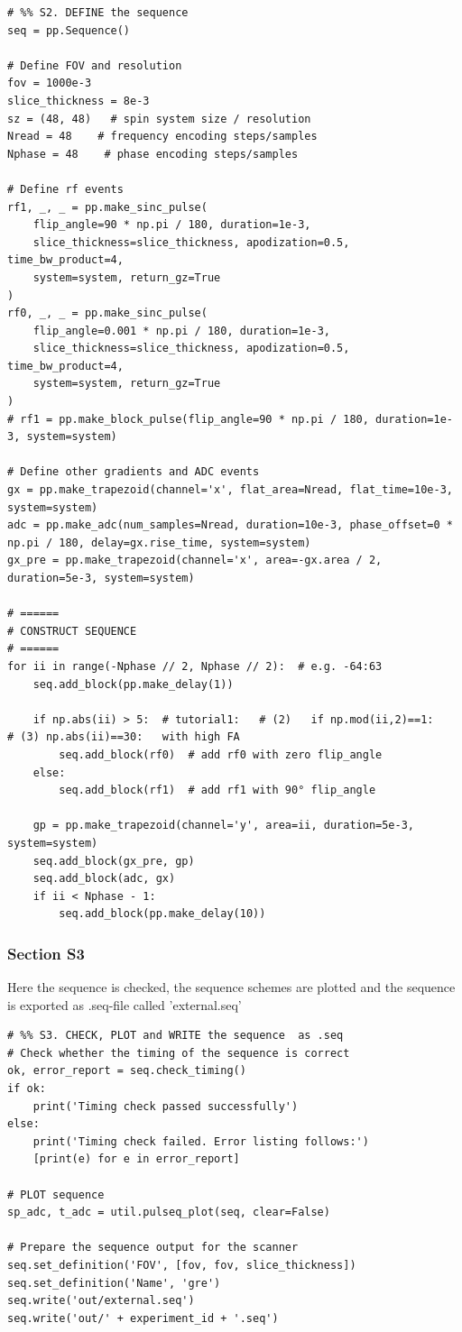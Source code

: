 \documentclass[a4paper,12pt]{extarticle}
\begin{document}
\begin{verbatim}
# %% S2. DEFINE the sequence
seq = pp.Sequence()

# Define FOV and resolution
fov = 1000e-3
slice_thickness = 8e-3
sz = (48, 48)   # spin system size / resolution
Nread = 48    # frequency encoding steps/samples
Nphase = 48    # phase encoding steps/samples

# Define rf events
rf1, _, _ = pp.make_sinc_pulse(
    flip_angle=90 * np.pi / 180, duration=1e-3,
    slice_thickness=slice_thickness, apodization=0.5, time_bw_product=4,
    system=system, return_gz=True
)
rf0, _, _ = pp.make_sinc_pulse(
    flip_angle=0.001 * np.pi / 180, duration=1e-3,
    slice_thickness=slice_thickness, apodization=0.5, time_bw_product=4,
    system=system, return_gz=True
)
# rf1 = pp.make_block_pulse(flip_angle=90 * np.pi / 180, duration=1e-3, system=system)

# Define other gradients and ADC events
gx = pp.make_trapezoid(channel='x', flat_area=Nread, flat_time=10e-3, system=system)
adc = pp.make_adc(num_samples=Nread, duration=10e-3, phase_offset=0 * np.pi / 180, delay=gx.rise_time, system=system)
gx_pre = pp.make_trapezoid(channel='x', area=-gx.area / 2, duration=5e-3, system=system)

# ======
# CONSTRUCT SEQUENCE
# ======
for ii in range(-Nphase // 2, Nphase // 2):  # e.g. -64:63
    seq.add_block(pp.make_delay(1))

    if np.abs(ii) > 5:  # tutorial1:   # (2)   if np.mod(ii,2)==1:    # (3) np.abs(ii)==30:   with high FA
        seq.add_block(rf0)  # add rf0 with zero flip_angle
    else:
        seq.add_block(rf1)  # add rf1 with 90° flip_angle

    gp = pp.make_trapezoid(channel='y', area=ii, duration=5e-3, system=system)
    seq.add_block(gx_pre, gp)
    seq.add_block(adc, gx)
    if ii < Nphase - 1:
        seq.add_block(pp.make_delay(10))
\end{verbatim}

\subsubsection{Section S3}
Here the sequence is checked, the sequence schemes are plotted and the sequence is exported as .seq-file called 'external.seq'
\begin{verbatim}
# %% S3. CHECK, PLOT and WRITE the sequence  as .seq
# Check whether the timing of the sequence is correct
ok, error_report = seq.check_timing()
if ok:
    print('Timing check passed successfully')
else:
    print('Timing check failed. Error listing follows:')
    [print(e) for e in error_report]

# PLOT sequence
sp_adc, t_adc = util.pulseq_plot(seq, clear=False)

# Prepare the sequence output for the scanner
seq.set_definition('FOV', [fov, fov, slice_thickness])
seq.set_definition('Name', 'gre')
seq.write('out/external.seq')
seq.write('out/' + experiment_id + '.seq')
\end{verbatim}
\end{document}
